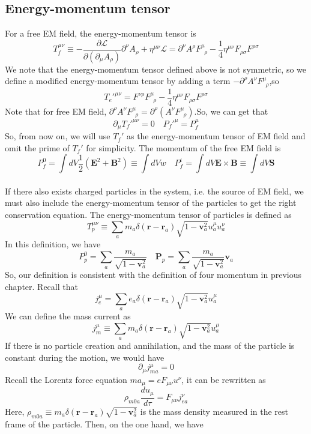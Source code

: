 \documentclass[cyan]{elegantnote}
\begin{document}
\subsection{Energy-momentum tensor}
\noindent
For a free EM field, the energy-momentum tensor is
\[T_f^{\mu \nu} \equiv -\frac{\partial \mathcal{L}}{\partial(\partial_{\mu}A_{\rho})} \partial^{\nu} A_{\rho} + \eta^{\mu \nu} \mathcal{L} = \partial^{\nu}A^{\rho} F^{\mu}_{\phantom{\rho}\rho}-\frac{1}{4}\eta^{\mu\nu}F_{\rho\sigma}F^{\rho\sigma}\]
We note that the energy-momentum tensor defined above is not symmetric, so we define a modified energy-momentum tensor by adding a term $-\partial^{\rho}A^{\nu}F^{\mu}_{\phantom{\rho}\rho}$,so
\[T_e'^{\mu\nu} = F^{\nu\rho}F^{\mu}_{\phantom{\rho}\rho}-\frac{1}{4}\eta^{\mu\nu}F_{\rho\sigma}F^{\rho\sigma}\]
Note that for free EM field, $\partial^{\rho}A^{\nu}F^{\mu}_{\phantom{\rho}\rho} = \partial^{\rho}\left(A^{\nu}F^{\mu}_{\phantom{\rho}\rho}\right)$.So,
we can get that
\[\partial_{\mu}T_f'^{\mu\nu} = 0 \quad P_f'^{\mu} = P_f^{\mu}\]
So, from now on, we will use $T_f'$ as the energy-momentum tensor of EM field and omit the prime of $T_f'$ for simplicity.
The momentum of the free EM field is
\[P_f^{0} = \int dV \frac{1}{2}(\bm{E}^2+\bm{B}^2) \equiv \int dV w \quad P_f^{i} = \int dV \bm{E} \times \bm{B} \equiv \int dV \bm{S}\]\\
If there also exists charged particles in the system, i.e. the source of EM field, we must also include the energy-momentum tensor of the particles to get the right conservation equation. The energy-momentum tensor of particles is defined as
\[T_p^{\mu\nu} \equiv \sum_a m_a \delta(\bm{r}-\bm{r}_a) \sqrt{1-\bm{v}_a^2} u_a^\mu u_a^{\nu}\]
In this definition, we have
\[P_p^0 = \sum_a \frac{m_a}{\sqrt{1-\bm{v}_a^2}} \quad \bm{P}_p =  \sum_a \frac{m_a}{\sqrt{1-\bm{v}_a^2}} \bm{v}_a\]
So, our definition is consistent with the definition of four momentum in previous chapter.
Recall that
\[j^{\mu}_e = \sum_a e_a \delta(\bm{r}-\bm{r}_a) \sqrt{1-\bm{v}_a^2} u_a^\mu \]
We can define the mass current as
\[j^{\mu}_m \equiv \sum_a m_a \delta(\bm{r}-\bm{r}_a) \sqrt{1-\bm{v}_a^2} u_a^\mu \]
If there is no particle creation and annihilation, and the mass of the particle is constant during the motion, we would have
\[\partial_{\mu} j^{\mu}_{ma} = 0\]
Recall the Lorentz force equation $m a_{\mu} = eF_{\mu\nu}u^{\nu}$, it can be rewritten as
\[\rho_{m0a} \frac{du_{\mu}}{d\tau} = F_{\mu\nu}j_{ea}^{\nu}\]
Here, $\rho_{m0a} \equiv m_a \delta(\bm{r}-\bm{r}_a) \sqrt{1-\bm{v}_a^2}$ is the mass density measured in the rest frame of the particle. Then, on the one hand, we have
\end{document}
